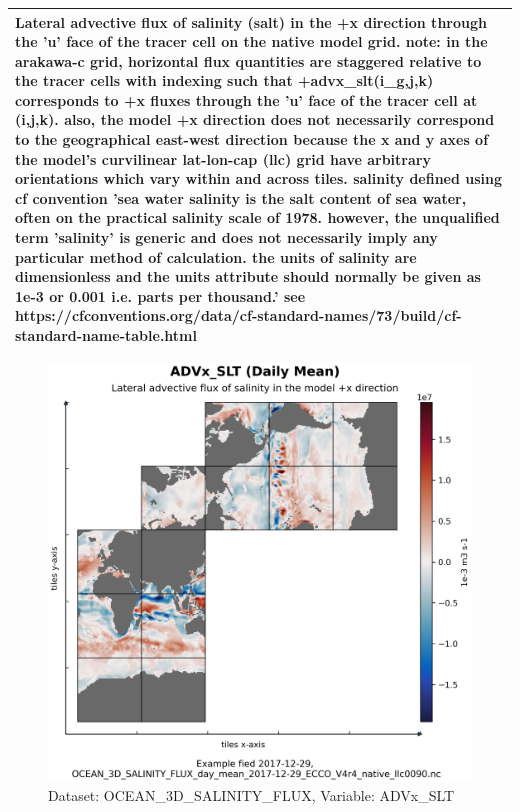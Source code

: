 \begin{longtable}{|m{}|m{}|m{}|m{}|}
\multicolumn{4}{|p{1\textwidth}|}{Lateral advective flux of salinity (salt) in the +x direction through the 'u' face of the tracer cell on the native model grid. note: in the arakawa-c grid, horizontal flux quantities are staggered relative to the tracer cells with indexing such that +advx\_slt(i\_g,j,k) corresponds to +x fluxes through the 'u' face of the tracer cell at (i,j,k). also, the model +x direction does not necessarily correspond to the geographical east-west direction because the x and y axes of the model's curvilinear lat-lon-cap (llc) grid have arbitrary orientations which vary within and across tiles. salinity defined using cf convention 'sea water salinity is the salt content of sea water, often on the practical salinity scale of 1978. however, the unqualified term 'salinity' is generic and does not necessarily imply any particular method of calculation. the units of salinity are dimensionless and the units attribute should normally be given as 1e-3 or 0.001 i.e. parts per thousand.' see https://cfconventions.org/data/cf-standard-names/73/build/cf-standard-name-table.html} \\ \hline
\end{longtable}

\begin{figure}[H]
\centering
\includegraphics[scale=0.55]{../images/plots/native_plots/Ocean_Three-Dimensional_Salinity_Fluxes/ADVx_SLT.png}
\caption{Dataset: OCEAN\_3D\_SALINITY\_FLUX, Variable: ADVx\_SLT}
\label{tab:table-OCEAN_3D_SALINITY_FLUX_ADVx_SLT-Plot}
\end{figure}
\pagebreak
